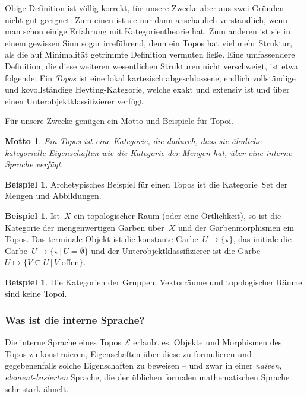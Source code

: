 \documentclass[a4paper,ngerman,12pt]{scrartcl}
\theoremstyle{definition}
\newtheorem{bsp}[defn]{Beispiel}
\theoremstyle{plain}
\newtheorem{motto}[defn]{Motto}
\theoremstyle{remark}
\newcommand{\E}{\mathcal{E}}
\newcommand{\Set}{\mathrm{Set}}
\renewcommand{\_}{\mathpunct{.}\,}
\newcommand{\?}{\,{:}\,}
\begin{document}
Obige Definition ist völlig korrekt, für unsere Zwecke aber aus zwei
Gründen nicht gut geeignet: Zum einen ist sie nur dann anschaulich
verständlich, wenn man schon einige Erfahrung mit Kategorientheorie hat. Zum
anderen ist sie in einem gewissen Sinn sogar irreführend, denn ein Topos hat
viel mehr Struktur, als die auf Minimalität getrimmte Definition vermuten ließe.
Eine umfassendere Definition, die diese weiteren wesentlichen Strukturen nicht
verschweigt, ist etwa folgende: Ein \emph{Topos} ist eine lokal kartesisch
abgeschlossene, endlich vollständige und kovollständige Heyting-Kategorie,
welche exakt und extensiv ist und über einen Unterobjektklassifizierer verfügt.

Für unsere Zwecke genügen ein Motto und Beispiele für Topoi.

\begin{motto}Ein Topos ist eine Kategorie, die dadurch, dass sie ähnliche
kategorielle Eigenschaften wie die Kategorie der Mengen hat, über eine
\emph{interne Sprache} verfügt.\end{motto}

\begin{bsp}Archetypisches Beispiel für einen Topos ist die Kategorie~$\Set$ der
Mengen und Abbildungen.
\end{bsp}

\begin{bsp}Ist~$X$ ein topologischer Raum (oder eine Örtlichkeit), so ist die
Kategorie der mengenwertigen Garben über~$X$ und der Garbenmorphismen ein
Topos. Das terminale Objekt ist die konstante Garbe~$U \mapsto \{ \star \}$,
das initiale die Garbe~$U \mapsto \{ \star \,|\, U = \emptyset \}$ und der
Unterobjektklassifizierer ist die Garbe~$U \mapsto \{ V \subseteq U \,|\,
\text{$V$ offen} \}$.
\end{bsp}

\begin{bsp}Die Kategorien der Gruppen, Vektorräume und topologischer Räume sind
keine Topoi.\end{bsp}


\subsubsection*{Was ist die interne Sprache?}

Die interne Sprache eines Topos~$\E$ erlaubt es,
Objekte und Morphismen des Topos zu konstruieren,
Eigenschaften über diese zu formulieren und
gegebenenfalls solche Eigenschaften zu beweisen --
und zwar in einer \emph{naiven}, \emph{element-basierten} Sprache, die der
üblichen formalen mathematischen Sprache sehr stark ähnelt.
\end{document}
